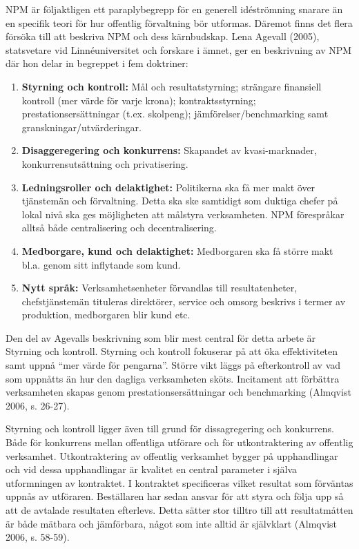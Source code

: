 NPM är följaktligen ett paraplybegrepp för en generell idéströmning snarare än en specifik teori för hur offentlig förvaltning bör utformas. Däremot finns det flera försöka till att beskriva NPM och dess kärnbudskap. Lena Agevall (2005), statsvetare vid Linnéuniversitet och forskare i ämnet, ger en beskrivning av NPM där hon delar in begreppet i fem doktriner:

\begin{enumerate}
  \item \textbf{Styrning och kontroll:} Mål och resultatstyrning; strängare finansiell kontroll (mer värde för varje krona); kontraktsstyrning; prestationsersättningar (t.ex. skolpeng); jämförelser/benchmarking samt granskningar/utvärderingar.
  \item \textbf{Disaggeregering och konkurrens:} Skapandet av kvasi-marknader, konkurrensutsättning och privatisering.
  \item \textbf{Ledningsroller och delaktighet:} Politikerna ska få mer makt över tjänstemän och förvaltning. Detta ska ske samtidigt som duktiga chefer på lokal nivå ska ges möjligheten att målstyra verksamheten. NPM förespråkar alltså både centralisering och decentralisering.
  \item \textbf{Medborgare, kund och delaktighet:} Medborgaren ska få större makt bl.a. genom sitt inflytande som kund.
  \item \textbf{Nytt språk:} Verksamhetsenheter förvandlas till resultatenheter, chefstjänstemän tituleras direktörer, service och omsorg beskrivs i termer av produktion, medborgaren blir kund etc.
\end{enumerate}

Den del av Agevalls beskrivning som blir mest central för detta arbete är Styrning och kontroll. Styrning och kontroll fokuserar på att öka effektiviteten samt uppnå “mer värde för pengarna”. Större vikt läggs på efterkontroll av vad som uppnåtts än hur den dagliga verksamheten sköts. Incitament att förbättra verksamheten skapas genom prestationsersättningar och benchmarking (Almqvist 2006, s. 26-27).
 
Styrning och kontroll ligger även till grund för dissagregering och konkurrens. Både för konkurrens mellan offentliga utförare och för utkontraktering av offentlig verksamhet. Utkontraktering av offentlig verksamhet bygger på upphandlingar och vid dessa upphandlingar är kvalitet en central parameter i själva utformningen av kontraktet. I kontraktet specificeras vilket resultat som förväntas uppnås av utföraren. Beställaren har sedan ansvar för att styra och följa upp så att de avtalade resultaten efterlevs. Detta sätter stor tilltro till att resultatmåtten är både mätbara och jämförbara, något som inte alltid är självklart (Almqvist 2006, s. 58-59).
 
